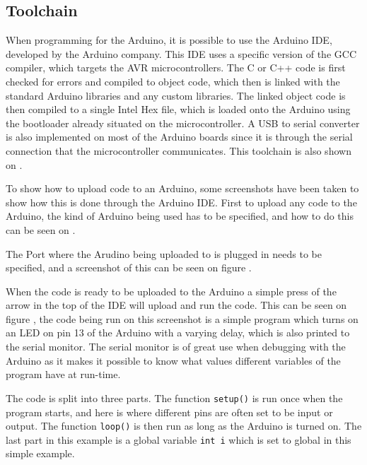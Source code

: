 \subsection{Toolchain}
When programming for the Arduino, it is possible to use the Arduino IDE, developed by the Arduino company.
This IDE uses a specific version of the GCC compiler, which targets the AVR microcontrollers.
The C or C++ code is first checked for errors and compiled to object code, which then is linked with the standard Arduino libraries and any custom libraries.
The linked object code is then compiled to a single Intel Hex file, which is loaded onto the Arduino using the bootloader already situated on the microcontroller.
A USB to serial converter is also implemented on most of the Arduino boards since it is through the serial connection that the microcontroller communicates. 
This toolchain is also shown on .\cite{2015ArduinoToolchain}


\noindent
To show how to upload code to an Arduino, some screenshots have been taken to show how this is done through the Arduino IDE.
First to upload any code to the Arduino, the kind of Arduino being used has to be specified, and how to do this can be seen on .

The Port where the Arudino being uploaded to is plugged in needs to be specified, and a screenshot of this can be seen on figure .

When the code is ready to be uploaded to the Arduino a simple press of the arrow in the top of the IDE will upload and run the code. 
This can be seen on figure , the code being run on this screenshot is a simple program which turns on an LED on pin 13 of the Arduino with a varying delay, which is also printed to the serial monitor.
The serial monitor is of great use when debugging with the Arduino as it makes it possible to know what values different variables of the program have at run-time.

The code is split into three parts.
The function \texttt{setup()} is run once when the program starts, and here is where different pins are often set to be input or output.
The function \texttt{loop()} is then run as long as the Arduino is turned on. 
The last part in this example is a global variable \texttt{int i} which is set to global in this simple example.

